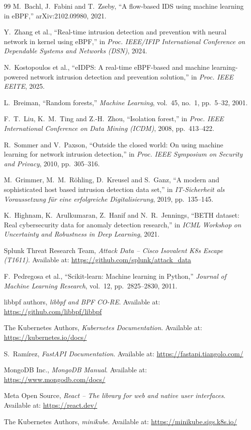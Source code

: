 \begin{thebibliography}{99}
M.~Bachl, J.~Fabini and T.~Zseby, ``A flow-based IDS using machine learning in eBPF,''
arXiv:2102.09980, 2021.

Y.~Zhang et al., ``Real-time intrusion detection and prevention with neural network in
kernel using eBPF,'' in \textit{Proc. IEEE/IFIP International Conference on Dependable
Systems and Networks (DSN)}, 2024.

N.~Kostopoulos et al., ``eIDPS: A real-time eBPF-based and machine learning-powered
network intrusion detection and prevention solution,'' in \textit{Proc. IEEE EEITE},
2025.

L.~Breiman, ``Random forests,'' \textit{Machine Learning}, vol.~45, no.~1, pp.~5--32,
2001.

F.~T.~Liu, K.~M.~Ting and Z.-H.~Zhou, ``Isolation forest,'' in \textit{Proc. IEEE
International Conference on Data Mining (ICDM)}, 2008, pp.~413--422.

R.~Sommer and V.~Paxson, ``Outside the closed world: On using machine learning for
network intrusion detection,'' in \textit{Proc. IEEE Symposium on Security and Privacy},
2010, pp.~305--316.

M.~Grimmer, M.~M.~R\"ohling, D.~Kreusel and S.~Ganz, ``A modern and sophisticated host
based intrusion detection data set,'' in \textit{IT-Sicherheit als Voraussetzung f\"ur
eine erfolgreiche Digitalisierung}, 2019, pp.~135--145.

K.~Highnam, K.~Arulkumaran, Z.~Hanif and N.~R.~Jennings, ``BETH dataset: Real
cybersecurity data for anomaly detection research,'' in \textit{ICML Workshop on
Uncertainty and Robustness in Deep Learning}, 2021.

Splunk Threat Research Team, \textit{Attack Data -- Cisco Isovalent K8s Escape
(T1611)}. Available at: \url{https://github.com/splunk/attack_data}

F.~Pedregosa et al., ``Scikit-learn: Machine learning in Python,'' \textit{Journal of
Machine Learning Research}, vol.~12, pp.~2825--2830, 2011.

libbpf authors, \textit{libbpf and BPF CO-RE}. Available at:
\url{https://github.com/libbpf/libbpf}

The Kubernetes Authors, \textit{Kubernetes Documentation}. Available at:
\url{https://kubernetes.io/docs/}

S.~Ram\'irez, \textit{FastAPI Documentation}. Available at:
\url{https://fastapi.tiangolo.com/}

MongoDB Inc., \textit{MongoDB Manual}. Available at: \url{https://www.mongodb.com/docs/}

Meta Open Source, \textit{React -- The library for web and native user interfaces}.
Available at: \url{https://react.dev/}

The Kubernetes Authors, \textit{minikube}. Available at:
\url{https://minikube.sigs.k8s.io/}

\end{thebibliography}
